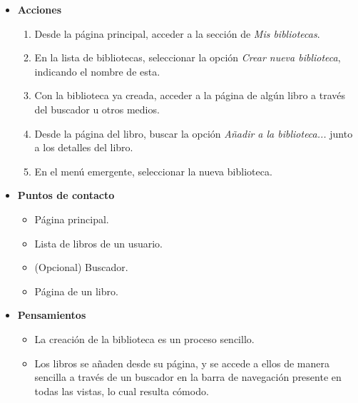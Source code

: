 \begin{itemize}
    \item \textbf{Acciones}
    \begin{enumerate}
        \item Desde la página principal, acceder a la sección de \textit{Mis bibliotecas}.
        \item En la lista de bibliotecas, seleccionar la opción \textit{Crear nueva biblioteca}, indicando el nombre de esta.
        \item Con la biblioteca ya creada, acceder a la página de algún libro a través del buscador u otros medios.
        \item Desde la página del libro, buscar la opción \textit{Añadir a la biblioteca...} junto a los detalles del libro.
        \item En el menú emergente, seleccionar la nueva biblioteca.
    \end{enumerate}
\item \textbf{Puntos de contacto}
    \begin{itemize}
        \item Página principal.
        \item Lista de libros de un usuario.
        \item (Opcional) Buscador.
        \item Página de un libro.
    \end{itemize}
\item \textbf{Pensamientos}
    \begin{itemize}
        \item La creación de la biblioteca es un proceso sencillo.
        \item Los libros se añaden desde su página, y se accede a ellos de manera sencilla a través de un buscador en la barra de navegación presente en todas las vistas, lo cual resulta cómodo.
    \end{itemize}
\end{itemize}

